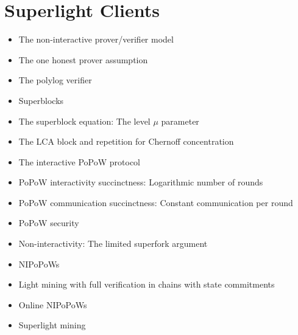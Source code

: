 \chapter{Superlight Clients}

{\color{red}
\begin{itemize}
\item The non-interactive prover/verifier model
\item The one honest prover assumption
\item The polylog verifier
\item Superblocks
\item The superblock equation: The level $\mu$ parameter
\item The LCA block and repetition for Chernoff concentration
\item The interactive PoPoW protocol
\item PoPoW interactivity succinctness: Logarithmic number of rounds
\item PoPoW communication succinctness: Constant communication per round
\item PoPoW security
\item Non-interactivity: The limited superfork argument
\item NIPoPoWs
\item Light mining with full verification in chains with state commitments
\item Online NIPoPoWs
\item Superlight mining
\end{itemize}
}
